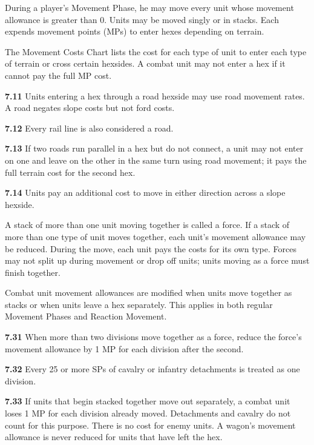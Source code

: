
During a player's Movement Phase, he may move every unit whose movement allowance is greater than 0. Units may be moved singly or in stacks. Each expends movement points (MPs) to enter hexes depending on terrain.


The Movement Costs Chart lists the cost for each type of unit to enter each type of terrain or cross certain hexsides. A combat unit may not enter a hex if it cannot pay the full MP cost.

\textbf{7.11} Units entering a hex through a road hexside may use road movement rates. A road negates slope costs but not ford costs.

\textbf{7.12} Every rail line is also considered a road.

\textbf{7.13} If two roads run parallel in a hex but do not connect, a unit may not enter on one and leave on the other in the same turn using road movement; it pays the full terrain cost for the second hex.

\textbf{7.14} Units pay an additional cost to move in either direction across a slope hexside.


A stack of more than one unit moving together is called a force. If a stack of more than one type of unit moves together, each unit's movement allowance may be reduced. During the move, each unit pays the costs for its own type. Forces may not split up during movement or drop off units; units moving as a force must finish together.


Combat unit movement allowances are modified when units move together as stacks or when units leave a hex separately. This applies in both regular Movement Phases and Reaction Movement.

\textbf{7.31} When more than two divisions move together as a force, reduce the force's movement allowance by 1 MP for each division after the second.

\textbf{7.32} Every 25 or more SPs of cavalry or infantry detachments is treated as one division.

\textbf{7.33} If units that begin stacked together move out separately, a combat unit loses 1 MP for each division already moved. Detachments and cavalry do not count for this purpose. There is no cost for enemy units. A wagon's movement allowance is never reduced for units that have left the hex.


